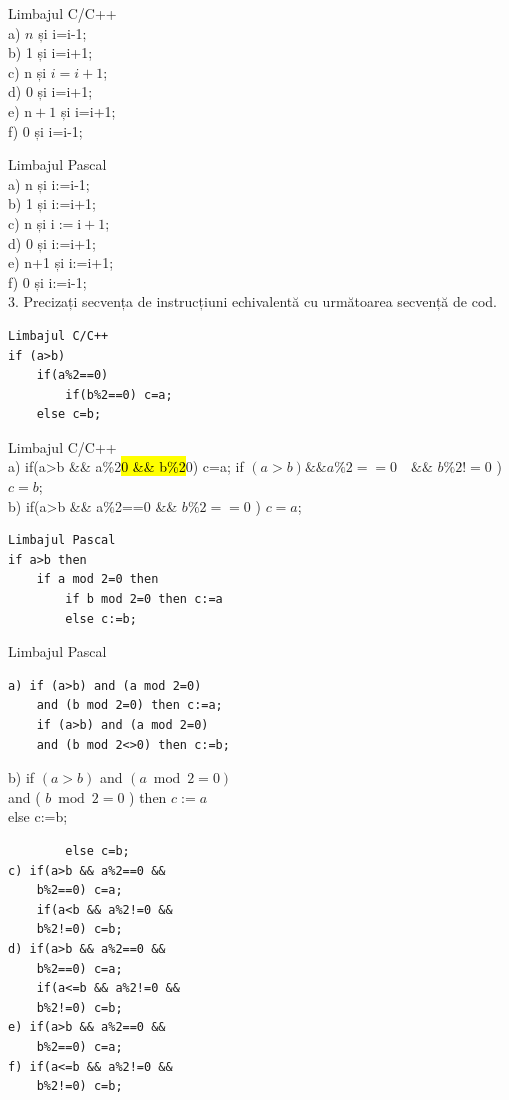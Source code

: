 \documentclass[10pt]{article}
\begin{document}
Limbajul C/C++\\
a) $n$ și i=i-1;\\
b) 1 și i=i+1;\\
c) n și $i=i+1$;\\
d) 0 și i=i+1;\\
e) $\mathrm{n}+1$ și i=i+1;\\
f) 0 și i=i-1;

Limbajul Pascal\\
a) n și i:=i-1;\\
b) 1 și i:=i+1;\\
c) n și $\mathrm{i}:=\mathrm{i}+1$;\\
d) 0 și i:=i+1;\\
e) n+1 și i:=i+1;\\
f) 0 și i:=i-1;\\
3. Precizați secvența de instrucțiuni echivalentă cu următoarea secvență de cod.

\begin{verbatim}
Limbajul C/C++
if (a>b)
    if(a%2==0)
        if(b%2==0) c=a;
    else c=b;
\end{verbatim}

Limbajul C/C++\\
a) if(a>b \&\& a\%2\hl{0 \&\& b\%2}0) c=a; if $(a>b) \& \& a \% 2==0 \quad \& \&$ $b \% 2!=0$ ) $c=b$;\\
b) if(a>b \&\& a\%2==0 \&\& $b \% 2==0$ ) $c=a$;

\begin{verbatim}
Limbajul Pascal
if a>b then
    if a mod 2=0 then
        if b mod 2=0 then c:=a
        else c:=b;
\end{verbatim}

Limbajul Pascal

\begin{verbatim}
a) if (a>b) and (a mod 2=0)
    and (b mod 2=0) then c:=a;
    if (a>b) and (a mod 2=0)
    and (b mod 2<>0) then c:=b;
\end{verbatim}

b) if $(a>b)$ and $(a \bmod 2=0)$\\
and ( $b \bmod 2=0$ ) then $c:=a$\\
else c:=b;

\begin{verbatim}
        else c=b;
c) if(a>b && a%2==0 &&
    b%2==0) c=a;
    if(a<b && a%2!=0 &&
    b%2!=0) c=b;
d) if(a>b && a%2==0 &&
    b%2==0) c=a;
    if(a<=b && a%2!=0 &&
    b%2!=0) c=b;
e) if(a>b && a%2==0 &&
    b%2==0) c=a;
f) if(a<=b && a%2!=0 &&
    b%2!=0) c=b;
\end{verbatim}
\end{document}
